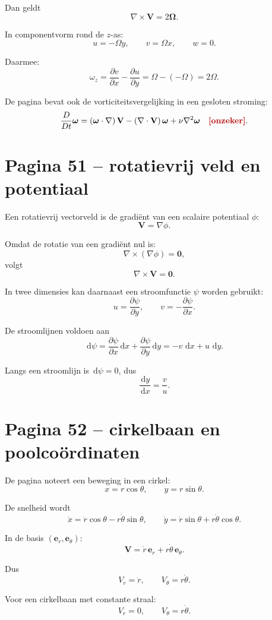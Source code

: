 \documentclass[11pt,a4paper]{article}
\newcommand{\onzeker}[1]{\ifmmode\text{\color{red!70!black}\bfseries[onzeker]}\else\textcolor{red!70!black}{\textbf{[onzeker:} #1\textbf{]}}\fi}
\newcommand{\dd}{\,\mathrm{d}}
\newcommand{\Dt}{\frac{D}{Dt}}
\newcommand{\divergence}{\nabla\cdot}
\newcommand{\grad}{\nabla}
\newcommand{\curl}{\nabla\times}
\newcommand{\V}{\mathbf{V}}
\newcommand{\omegav}{\bm{\omega}}
\newcommand{\Omegav}{\bm{\Omega}}
\begin{document}
Dan geldt
$$
\curl\V = 2\Omegav.
$$

In componentvorm rond de $z$-as:
$$
u=-\Omega y,
\qquad
v=\Omega x,
\qquad
w=0.
$$

Daarmee:
$$
\omega_z
=
\frac{\partial v}{\partial x}
-
\frac{\partial u}{\partial y}
=
\Omega - \left(-\Omega\right)
=
2\Omega.
$$

De pagina bevat ook de vorticiteitsvergelijking in een gesloten stroming:
$$
\Dt\omegav
=
\left(\omegav\cdot\grad\right)\V
-
\left(\divergence\V\right)\omegav
+
\nu\grad^2\omegav
\quad
\onzeker{zonder barokliene term}.
$$

\section*{Pagina 51 -- rotatievrij veld en potentiaal}

Een rotatievrij vectorveld is de gradiënt van een scalaire potentiaal $\phi$:
$$
\V = \grad \phi.
$$

Omdat de rotatie van een gradiënt nul is:
$$
\curl\left(\grad\phi\right)=\mathbf{0},
$$
volgt
$$
\curl \V = \mathbf{0}.
$$

In twee dimensies kan daarnaast een stroomfunctie $\psi$ worden gebruikt:
$$
u = \frac{\partial \psi}{\partial y},
\qquad
v = -\frac{\partial \psi}{\partial x}.
$$

De stroomlijnen voldoen aan
$$
\dd \psi
=
\frac{\partial \psi}{\partial x}\dd x
+
\frac{\partial \psi}{\partial y}\dd y
=
-v\,\dd x + u\,\dd y.
$$

Langs een stroomlijn is $\dd\psi=0$, dus
$$
\frac{\dd y}{\dd x}
=
\frac{v}{u}.
$$

\section*{Pagina 52 -- cirkelbaan en poolcoördinaten}

De pagina noteert een beweging in een cirkel:
$$
x=r\cos\theta,
\qquad
y=r\sin\theta.
$$

De snelheid wordt
$$
\dot{x}
=
\dot{r}\cos\theta
-
r\dot{\theta}\sin\theta,
\qquad
\dot{y}
=
\dot{r}\sin\theta
+
r\dot{\theta}\cos\theta.
$$

In de basis $\left(\mathbf{e}_r,\mathbf{e}_\theta\right)$:
$$
\V
=
\dot{r}\,\mathbf{e}_r
+
r\dot{\theta}\,\mathbf{e}_\theta.
$$

Dus
$$
V_r=\dot r,
\qquad
V_\theta=r\dot\theta.
$$

Voor een cirkelbaan met constante straal:
$$
V_r=0,
\qquad
V_\theta=r\dot{\theta}.
$$
\end{document}
